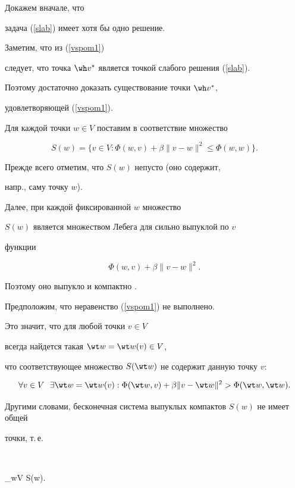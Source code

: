\begin{pf}


Докажем вначале, что


задача (\ref{slab}) имеет хотя бы одно решение.


Заметим, что из (\ref{vspom1})


следует, что точка $\wh v^*$ является точкой слабого решения (\ref{slab}).


Поэтому достаточно доказать существование точки $\wh v^*$,


удовлетворяющей (\ref{vspom1}).


Для каждой точки $w\in V$ поставим в соответствие множество


$$


S(w) = \{v\in V: \Phi(w,v) +


\beta \|v-w\|^2 \leq \Phi(w,w)\}.


$$


Прежде всего отметим, что $S(w)$ непусто (оно содержит, 


напр., саму точку $w$).


Далее, при каждой фиксированной $w$ множество


$S(w)$ является множеством Лебега для сильно выпуклой по $v$


функции


$$


\Phi(w,v) + \beta \|v-w\|^2.


$$


Поэтому оно выпукло и компактно \cite{vasil'ev}.





Предположим, что неравенство (\ref{vspom1}) не выполнено. 


Это значит, что для любой точки $v\in V$


всегда найдется такая $\wt w = \wt w(v)\in V$, 


что соответствующее множество $S(\wt w)$ не содержит данную точку $v$:


$$


\forall v\in V\ \ \exists \wt w = \wt w(v):


 \Phi(\wt w, v) + \beta \| v - \wt w\|^2 > \Phi(\wt w,\wt w).


 $$


Другими словами, бесконечная система выпуклых компактов $S(w)$ не имеет общей


точки, т.\,е.


$$


\bigcap_{w\in V} S(w)\equiv \emptyset.



\end{pf}
